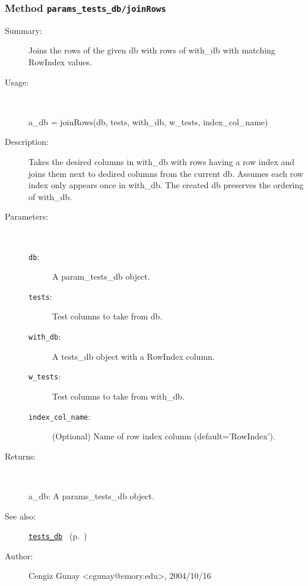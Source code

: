 \subsubsection[Method \texttt{joinRows}]{Method \texttt{params\_tests\_db/joinRows}}%
%
\label{ref_params_tests_db__joinRows}%
\hypertarget{ref_params_tests_db__joinRows}{}%
\begin{description}
\item[Summary:]Joins the rows of the given db with rows of with\_db with matching
  	RowIndex values.
%
\item[Usage:]~%
\begin{lyxcode}%
a\_db = joinRows(db, tests, with\_db, w\_tests, index\_col\_name)
%
\end{lyxcode}%
%
\item[Description:]%
Takes the desired columns in with\_db with rows having a 
 row index and joins them next to dedired columns from the current db. 
 Assumes each row index only appears once in with\_db. The created
 db preserves the ordering of with\_db.
\item[Parameters:]~
\begin{description}%
\item[\texttt{db}:]
 A param\_tests\_db object.
\item[\texttt{tests}:]
 Test columns to take from db.
\item[\texttt{with\_db}:]
 A tests\_db object with a RowIndex column.
\item[\texttt{w\_tests}:]
 Test columns to take from with\_db.
\item[\texttt{index\_col\_name}:]
 (Optional) Name of row index column (default='RowIndex').
\end{description}%
%
\item[Returns:]~

	a\_db: A params\_tests\_db object.
%
%
\item[See also:]%
\hyperlink{ref_tests_db}{\texttt{tests\_db}}%
\ (p.~\pageref{ref_tests_db})%
%
%
\item[Author:]%
Cengiz Gunay <cgunay@emory.edu>, 2004/10/16%
\end{description}
\methodline%
